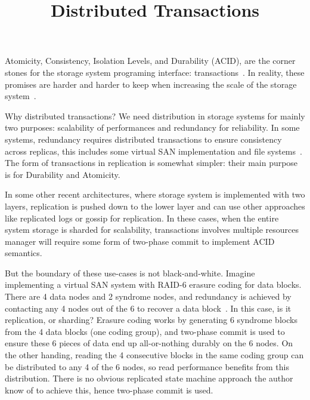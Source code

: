 



\tableofcontents

\title{Distributed Transactions}
\maketitle

Atomicity, Consistency, Isolation Levels, and Durability (ACID), are the
corner stones for the storage system programing interface:
transactions~\cite{gray1992transaction}. In reality, these promises are
harder and harder to keep when increasing the scale of the storage
system~\cite{bailis2013highly}.

Why distributed transactions? We need distribution in storage systems for
mainly two purposes: scalability of performances and redundancy for
reliability. In some systems, redundancy requires distributed transactions to
ensure consistency across replicas, this includes some virtual SAN
implementation and file systems~\cite{ghemawat2003google}. The form of
transactions in replication is somewhat simpler: their main purpose is for
Durability and Atomicity. 

In some other recent architectures, where storage system is implemented with
two layers\cite{Cooper_2013, cao2018polarfs,weil2006ceph,
verbitski2017amazon, peng2010large}, replication is pushed down to the lower
layer and can use other approaches like replicated logs or gossip for
replication. In these cases, when the entire system storage is sharded for
scalability, transactions involves multiple resources manager will require
some form of two-phase commit to implement ACID semantics.

But the boundary of these use-cases is not black-and-white. Imagine
implementing a virtual SAN system with RAID-6 erasure coding for data
blocks. There are 4 data nodes and 2 syndrome nodes, and redundancy is
achieved by contacting any 4 nodes out of the 6 to recover a data
block~\cite{plank2013erasure}. In this case, is it replication, or sharding?
Erasure coding works by generating 6 syndrome blocks from the 4 data blocks
(one coding group), and two-phase commit is used to ensure these 6 pieces of
data end up all-or-nothing durably on the 6 nodes. On the other handing,
reading the 4 consecutive blocks in the same coding group can be distributed
to any 4 of the 6 nodes, so read performance benefits from this distribution.
There is no obvious replicated state machine approach the author know of to
achieve this, hence two-phase commit is used.

